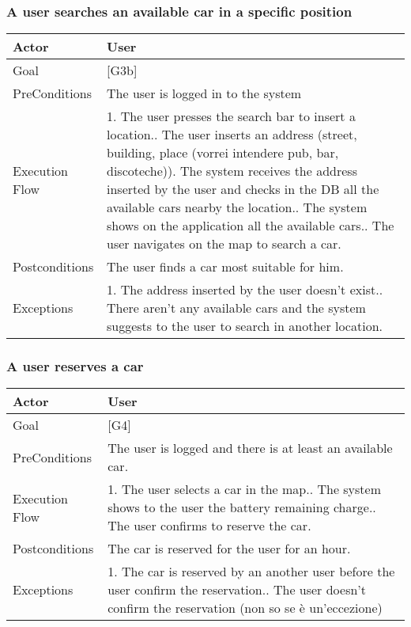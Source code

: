 \documentclass[english]{article}
\begin{document}
	\subsubsection{A user searches an available car in a specific position} 	\begin{tabularx}{\textwidth}{  l  X  } 		\hline 		Actor & User\\ 		\hline 		Goal & [G3b]\\ 		\hline 		PreConditions & The user is logged in to the system\\ 		\hline 		Execution Flow & 1. The user presses the search bar to insert a location.\newline 										 2. The user inserts an address (street, building, place (vorrei intendere pub, bar, discoteche))\newline 										 3. The system receives the address inserted by the user and checks in the DB all the available cars nearby the location.\newline 										 4. The system shows on the application all the available cars.\newline 										 5. The user navigates on the map to search a car.\\ 		\hline 		Postconditions & The user finds a car most suitable for him.\\ 		\hline 		Exceptions & 1. The address inserted by the user doesn't exist.\newline 								 2. There aren't any available cars and the system suggests to the user to search in another location.\\ 		\hline 	\end{tabularx}
	\subsubsection{A user reserves a car} 	\begin{tabularx}{\textwidth}{  l  X  } 		\hline 		Actor & User\\ 		\hline 		Goal & [G4]\\ 		\hline 		PreConditions & The user is logged and there is at least an available car.\\ 		\hline 		Execution Flow & 1. The user selects a car in the map.\newline 										 2. The system shows to the user the battery remaining charge.\newline 										 3. The user confirms to reserve the car.\\ 		\hline 		Postconditions & The car is reserved for the user for an hour. \\ 		\hline 		Exceptions & 1. The car is reserved by an another user before the user confirm the reservation.\newline 								 2. The user doesn't confirm the reservation (non so se è un'eccezione)\\ 		\hline 	\end{tabularx}
\end{document}
